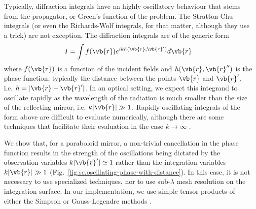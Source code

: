 \documentclass[11pt,SymmetricalJury]{inrsthesis/inrsthesis}
\begin{document}
Typically, diffraction integrals have an highly oscillatory behaviour that
stems from the propagator, or Green's function of the problem. The Stratton-Chu
integrals (or even the Richards-Wolf integrals, for that matter, although they
use a trick) are not exception. The diffraction integrals are of the generic form
  \begin{equation}
    I = \int f(\vb{r})e^{ikh(\vb{r},\vb{r}')}d\vb{r}
  \end{equation}
where $f(\vb{r})$ is a function of the incident fields and $h(\vb{r},\vb{r}'')$
is the phase function, typically the distance between the points $\vb{r}$ and
$\vb{r}'$, i.e. $h=|\vb{r}-\vb{r}'|$. In an optical setting, we expect this integrand to oscillate rapidly
as the wavelength of the radiation is much smaller than the size of the reflecting
mirror, i.e. $k|\vb{r}|\gg1$. Rapidly oscillating integrals of the form above
are difficult to evaluate numerically, although there are some techniques
that facilitate their evaluation in the case $k\rightarrow\infty$ \cite{Iserles2004,Ganesh2007}.

We show that, for a paraboloid mirror, a non-trivial cancellation in the phase function
results in the strength of the oscillations being dictated by the observation
variables $k|\vb{r}'|\simeq1$ rather than the integration variables $k|\vb{r}|\gg1$
(Fig.~\ref{fig:sc.oscillating-phase-with-distance}).
In this case, it is not necessary to use specialized techniques, nor to use
sub-$\lambda$ mesh resolution on the integration surface. In our implementation,
we use simple tensor products of either the Simpson or Gauss-Legendre methods
\cite[\S4.6]{Press1986}.
\end{document}
